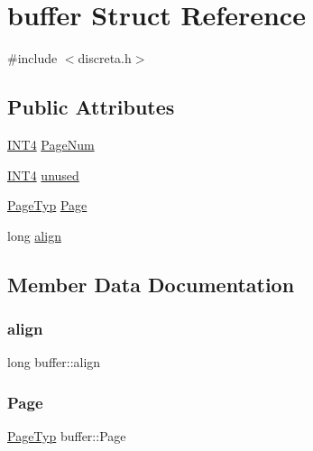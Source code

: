 \hypertarget{structbuffer}{}\section{buffer Struct Reference}
\label{structbuffer}


{\ttfamily \#include $<$discreta.\+h$>$}

\subsection*{Public Attributes}
\begin{DoxyCompactItemize}
\item 
\mbox{\hyperlink{galois_8h_a6675ac57b948be915e03c09228b57b05}{I\+N\+T4}} \mbox{\hyperlink{structbuffer_a76311739997d50ee769712e3073f40f7}{Page\+Num}}
\item 
\mbox{\hyperlink{galois_8h_a6675ac57b948be915e03c09228b57b05}{I\+N\+T4}} \mbox{\hyperlink{structbuffer_a30679a361b5a72146a3705d997655446}{unused}}
\item 
\mbox{\hyperlink{discreta_8h_a433b49570cf2edc4c827e6442bd33998}{Page\+Typ}} \mbox{\hyperlink{structbuffer_ac8963ac6b2d5abc4dfe40dcb149f5915}{Page}}
\item 
long \mbox{\hyperlink{structbuffer_a1e91f0dc28e2698d606514965d4441ff}{align}}
\end{DoxyCompactItemize}


\subsection{Member Data Documentation}
\mbox{\label{structbuffer_a1e91f0dc28e2698d606514965d4441ff}} 
\subsubsection{\texorpdfstring{align}{align}}
{\footnotesize\ttfamily long buffer\+::align}

\mbox{\label{structbuffer_ac8963ac6b2d5abc4dfe40dcb149f5915}} 
\subsubsection{\texorpdfstring{Page}{Page}}
{\footnotesize\ttfamily \mbox{\hyperlink{discreta_8h_a433b49570cf2edc4c827e6442bd33998}{Page\+Typ}} buffer\+::\+Page}


